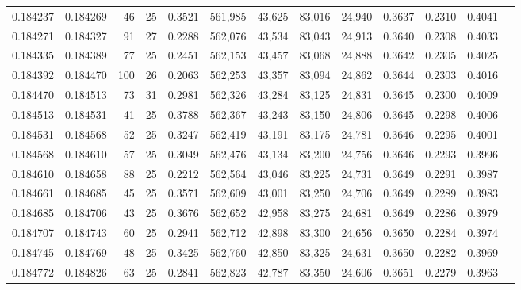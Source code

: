 \begin{tabular}{rrrrrrrrrrrrr}
0.184237 & 0.184269 &  46 &  25 &                                     0.3521 & 561,985 &  43,625 &  83,016 &  24,940 & 0.3637 & 0.2310 & 0.4041 \\
0.184271 & 0.184327 &  91 &  27 &                                     0.2288 & 562,076 &  43,534 &  83,043 &  24,913 & 0.3640 & 0.2308 & 0.4033 \\
0.184335 & 0.184389 &  77 &  25 &                                     0.2451 & 562,153 &  43,457 &  83,068 &  24,888 & 0.3642 & 0.2305 & 0.4025 \\
0.184392 & 0.184470 & 100 &  26 &                                     0.2063 & 562,253 &  43,357 &  83,094 &  24,862 & 0.3644 & 0.2303 & 0.4016 \\
0.184470 & 0.184513 &  73 &  31 &                                     0.2981 & 562,326 &  43,284 &  83,125 &  24,831 & 0.3645 & 0.2300 & 0.4009 \\
0.184513 & 0.184531 &  41 &  25 &                                     0.3788 & 562,367 &  43,243 &  83,150 &  24,806 & 0.3645 & 0.2298 & 0.4006 \\
0.184531 & 0.184568 &  52 &  25 &                                     0.3247 & 562,419 &  43,191 &  83,175 &  24,781 & 0.3646 & 0.2295 & 0.4001 \\
0.184568 & 0.184610 &  57 &  25 &                                     0.3049 & 562,476 &  43,134 &  83,200 &  24,756 & 0.3646 & 0.2293 & 0.3996 \\
0.184610 & 0.184658 &  88 &  25 &                                     0.2212 & 562,564 &  43,046 &  83,225 &  24,731 & 0.3649 & 0.2291 & 0.3987 \\
0.184661 & 0.184685 &  45 &  25 &                                     0.3571 & 562,609 &  43,001 &  83,250 &  24,706 & 0.3649 & 0.2289 & 0.3983 \\
0.184685 & 0.184706 &  43 &  25 &                                     0.3676 & 562,652 &  42,958 &  83,275 &  24,681 & 0.3649 & 0.2286 & 0.3979 \\
0.184707 & 0.184743 &  60 &  25 &                                     0.2941 & 562,712 &  42,898 &  83,300 &  24,656 & 0.3650 & 0.2284 & 0.3974 \\
0.184745 & 0.184769 &  48 &  25 &                                     0.3425 & 562,760 &  42,850 &  83,325 &  24,631 & 0.3650 & 0.2282 & 0.3969 \\
0.184772 & 0.184826 &  63 &  25 &                                     0.2841 & 562,823 &  42,787 &  83,350 &  24,606 & 0.3651 & 0.2279 & 0.3963 \\

\end{tabular}
